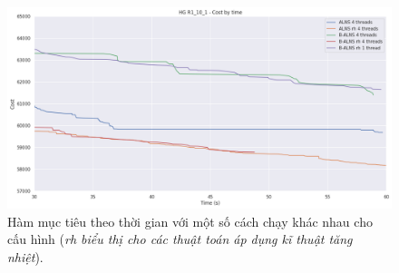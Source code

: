 \begin{figure}[H] %
  \centering %
  \includegraphics[width=1\textwidth]{figures/cost_time_R1_10_1_rh.png} 
  \caption{Hàm mục tiêu theo thời gian với một số cách chạy khác nhau cho cấu hình  (\textit{rh biểu thị cho các thuật toán áp dụng kĩ thuật tăng nhiệt}).} 
  \label{fig:reheat1}
\end{figure}
